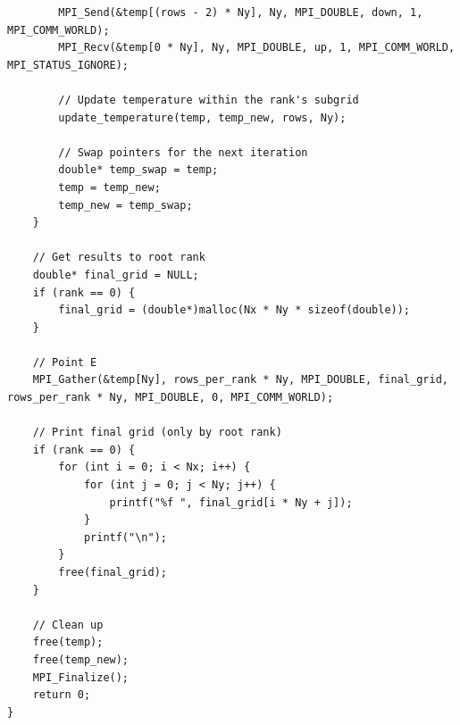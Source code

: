 \documentclass{article}
\begin{document}
\begin{lstlisting}
        MPI_Send(&temp[(rows - 2) * Ny], Ny, MPI_DOUBLE, down, 1, MPI_COMM_WORLD);
        MPI_Recv(&temp[0 * Ny], Ny, MPI_DOUBLE, up, 1, MPI_COMM_WORLD, MPI_STATUS_IGNORE);

        // Update temperature within the rank's subgrid
        update_temperature(temp, temp_new, rows, Ny);

        // Swap pointers for the next iteration
        double* temp_swap = temp;
        temp = temp_new;
        temp_new = temp_swap;
    }

    // Get results to root rank
    double* final_grid = NULL;
    if (rank == 0) {
        final_grid = (double*)malloc(Nx * Ny * sizeof(double));
    }

    // Point E
    MPI_Gather(&temp[Ny], rows_per_rank * Ny, MPI_DOUBLE, final_grid, rows_per_rank * Ny, MPI_DOUBLE, 0, MPI_COMM_WORLD);

    // Print final grid (only by root rank)
    if (rank == 0) {
        for (int i = 0; i < Nx; i++) {
            for (int j = 0; j < Ny; j++) {
                printf("%f ", final_grid[i * Ny + j]);
            }
            printf("\n");
        }
        free(final_grid);
    }

    // Clean up
    free(temp);
    free(temp_new);
    MPI_Finalize();
    return 0;
}
\end{lstlisting}
\end{document}

